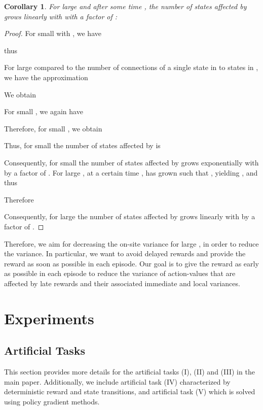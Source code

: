 \documentclass{article}
\newtheorem{corollaryA}{Corollary}\newtheorem{propositionA}{Proposition}\newtheorem{lemmaA}{Lemma}\newtheorem{conjectureA}{Conjecture}
\begin{document}
\begin{appendices}
\begin{corollaryA}
For large  and after some time ,
the number  of states affected by
 grows linearly with  with a factor of : 

\end{corollaryA}

\begin{proof}
For small  with , we have

thus


For large  compared to the number of connections  of a
single state in  to states in ,
we have the approximation

We obtain

For small , we again have

Therefore, for small , we obtain

Thus, for small  the number  of states affected by  is

Consequently, for small  the number  of states affected by  grows exponentially with  by a factor of .  
For large , at a certain time ,  has grown such that
, yielding
, and thus

Therefore 

Consequently, for large  the number  of states affected by
 grows linearly with  by a factor of .  
\end{proof}

Therefore, we aim for decreasing the on-site variance  for large , in order to
reduce the variance.
In particular, we want to avoid delayed rewards and provide the reward
as soon as possible in each episode.
Our goal is to give the reward as early as possible in each episode to reduce the
variance of action-values that are affected by late rewards and
their associated immediate and local variances.



\pagebreak
\section{Experiments}

\subsection{Artificial Tasks}
\label{sec:Aexp}
This section provides more details for the artificial tasks (I), (II) and (III) in the main paper. Additionally, we include artificial task (IV) characterized by deterministic reward and state transitions, and artificial task (V) which is solved using policy gradient methods.



\end{appendices}
\end{document}
